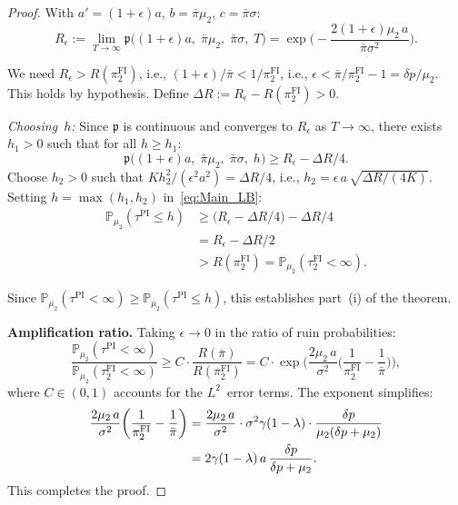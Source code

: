 \documentclass[12pt]{article}
\theoremstyle{remark}
\theoremstyle{definition}
\newcommand{\Prob}{\mathbb{P}}
\newcommand{\FI}{\mathrm{FI}}
\newcommand{\PI}{\mathrm{PI}}
\begin{document}
\begin{proof}
With $a' = (1+\epsilon)a$, $b = \bar{\pi}\mu_2$, $c = \bar{\pi}\sigma$:
\begin{equation}\label{eq:R_epsilon}
  R_\epsilon := \lim_{T \to \infty}\mathfrak{p}\!\bigl((1+\epsilon)a,\;
    \bar{\pi}\mu_2,\;\bar{\pi}\sigma,\;T\bigr)
  = \exp\!\biggl(-\frac{2(1+\epsilon)\mu_2\,a}{\bar{\pi}\sigma^2}\biggr).
\end{equation}

We need $R_\epsilon > R(\pi_2^{\FI})$, i.e.,
$(1+\epsilon)/\bar{\pi} < 1/\pi_2^{\FI}$, i.e.,
$\epsilon < \bar{\pi}/\pi_2^{\FI} - 1 = \delta p/\mu_2$.
This holds by hypothesis.
Define $\Delta R := R_\epsilon - R(\pi_2^{\FI}) > 0$.

\emph{Choosing~$h$:}
Since $\mathfrak{p}$ is continuous and converges to $R_\epsilon$ as
$T \to \infty$, there exists $h_1 > 0$ such that for all $h \ge h_1$:
\[
  \mathfrak{p}\!\bigl((1+\epsilon)a,\;\bar{\pi}\mu_2,\;
    \bar{\pi}\sigma,\;h\bigr)
  \ge R_\epsilon - \Delta R/4.
\]
Choose $h_2 > 0$ such that $K h_2^2/(\epsilon^2 a^2) = \Delta R/4$,
i.e., $h_2 = \epsilon\,a\,\sqrt{\Delta R/(4K)}$.
Setting $h = \max(h_1, h_2)$ in~\eqref{eq:Main_LB}:
\begin{align*}
  \Prob_{\mu_2}(\tau^{\PI} \le h)
  &\ge \bigl(R_\epsilon - \Delta R/4\bigr) - \Delta R/4 \\
  &= R_\epsilon - \Delta R/2 \\
  &> R(\pi_2^{\FI})
  = \Prob_{\mu_2}(\tau_2^{\FI} < \infty).
\end{align*}

Since $\Prob_{\mu_2}(\tau^{\PI} < \infty) \ge \Prob_{\mu_2}(\tau^{\PI} \le h)$,
this establishes part~(i) of the theorem.

\medskip\noindent\textbf{Amplification ratio.}
Taking $\epsilon \to 0$ in the ratio of ruin probabilities:
\begin{equation}\label{eq:amp_ratio_proof}
  \frac{\Prob_{\mu_2}(\tau^{\PI} < \infty)}
       {\Prob_{\mu_2}(\tau_2^{\FI} < \infty)}
  \ge C \cdot \frac{R(\bar{\pi})}{R(\pi_2^{\FI})}
  = C \cdot \exp\!\biggl(\frac{2\mu_2\,a}{\sigma^2}
    \biggl(\frac{1}{\pi_2^{\FI}} - \frac{1}{\bar{\pi}}\biggr)\biggr),
\end{equation}
where $C \in (0,1)$ accounts for the $L^2$~error terms.
The exponent simplifies:
\begin{align}\label{eq:ratio_exponent}
  \frac{2\mu_2\,a}{\sigma^2}\biggl(\frac{1}{\pi_2^{\FI}} - \frac{1}{\bar{\pi}}\biggr)
  &= \frac{2\mu_2\,a}{\sigma^2}\cdot\sigma^2\gamma(1-\lambda)
    \cdot\frac{\delta p}{\mu_2(\delta p + \mu_2)} \notag\\
  &= 2\gamma(1-\lambda)\,a\,\frac{\delta p}{\delta p + \mu_2}.
\end{align}
This completes the proof.
\end{proof}
\end{document}
